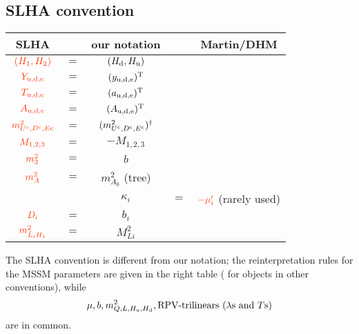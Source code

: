 \documentclass[CheatSheet]{subfiles}
\begin{document}
\newpage
\subsection{SLHA convention}
\begin{wraptable}{r}{220pt}\vspace{-3em}
 \begin{tabular}[t]{c@{\,}c@{\,}c@{\,}c@{\,}c}\toprule
 SLHA  && our notation && Martin/DHM\\\midrule
 $\C{(H_1, H_2)}$              &$=$& $(\Hd, \Hu)$ \\\midrule
 $\C{Y_{\mathrm{u,d,e}}}$      &$=$& $(y_{\mathrm{u,d,e}})^{\mathrm{T}}$\\
 $\C{T_{\mathrm{u,d,e}}}$      &$=$& $(a_{\mathrm{u,d,e}})^{\mathrm{T}}$\\
 $\C{A_{\mathrm{u,d,e}}}$      &$=$& $(A_{\mathrm{u,d,e}})^{\mathrm{T}}$\\
 $\C{m^2_{U^\cc,D^\cc, E\cc}}$ &$=$& $(m^2_{U^{\mathrm{c}},D^{\mathrm{c}}, E^{\mathrm{c}}})^\dagger$\\
 $\C{M_{1,2,3}}$               &$=$& $-M_{1,2,3}$\\
 $\C{m_3^2}$                   &$=$& $b$\\
 $\C{m_A^2}$                   &$=$& $m^2_{A_0}$ (tree)\\\midrule
 &&$\kappa_i$ &$=$& $\C{-\mu_i'}$ \footnotesize{(rarely used)}\\
 $\C{D_i}$                     &$=$& $b_i$\\
 $\C{m^2_{\tilde L_iH_1}}$     &$=$& $M^2_{Li}$ \\\bottomrule
 \end{tabular}
\end{wraptable}

The SLHA convention \cite{SLHA} is different from our notation; the reinterpretation rules for the MSSM parameters are given in the right table  (\textbf{} for objects in other conventions), while
\begin{equation*}
  \mu, b, m^2_{Q, L, \Hu, \Hd}, \text{RPV-trilinears ($\lambda$s and $T$s)}
\end{equation*}
 are in common.



\clearpage
\end{document}
